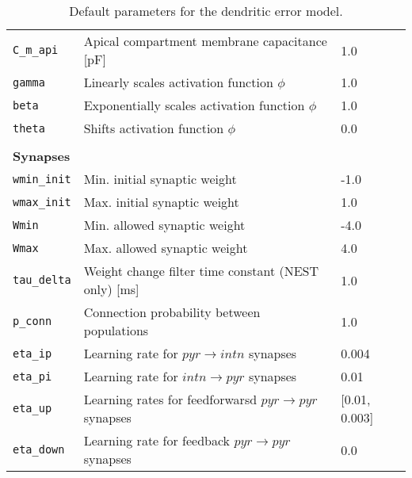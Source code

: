 \begin{table}
\begin{center}
\begin{tabular}{p{}p{}p{}}
      \\
      \texttt{C\_m\_api}           & Apical compartment membrane capacitance [pF]                                & 1.0
      \\
      \texttt{gamma}               & Linearly scales  activation function $\phi$                                 & 1.0
      \\
      \texttt{beta}                & Exponentially scales  activation function $\phi$                            & 1.0
      \\
      \texttt{theta}               & Shifts  activation function $\phi$                                          & 0.0
      \\

      \\
      \textbf{Synapses}
      \\\hline
      \texttt{wmin\_init}          & Min. initial synaptic weight                                                & -1.0
      \\
      \texttt{wmax\_init}          & Max. initial synaptic weight                                                & 1.0
      \\
      \texttt{Wmin}                & Min. allowed synaptic weight                                                & -4.0
      \\
      \texttt{Wmax}                & Max. allowed synaptic weight                                                & 4.0
      \\
      \texttt{tau\_delta}          & Weight change filter time constant (NEST only) [ms]                         & 1.0
      \\

      \texttt{p\_conn}             & Connection probability between populations                                  & 1.0
      \\
      \texttt{eta\_ip}             & Learning rate for $pyr\rightarrow intn$ synapses                            & 0.004
      \\
      \texttt{eta\_pi}             & Learning rate for $intn\rightarrow pyr$ synapses                            & 0.01
      \\
      \texttt{eta\_up}             & Learning rates for feedforwarsd $pyr\rightarrow pyr$ synapses               &
      [0.01, 0.003]
      \\
      \texttt{eta\_down}           & Learning rate for feedback $pyr\rightarrow pyr$ synapses                    & 0.0
      \\
    \end{tabular}\caption{Default parameters for the dendritic error model. }\label{tab-params}
  \end{center}
\end{table}
